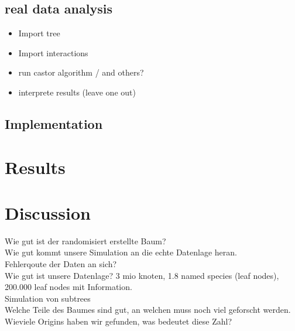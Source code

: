   \section{real data analysis}
    \begin{itemize}
      \item Import tree
      \item Import interactions
      \item run castor algorithm / and others?
      \item interprete results (leave one out)
    \end{itemize}

  \section{Implementation}

\chapter{Results}

\chapter{Discussion}
  Wie gut ist der randomisiert erstellte Baum? \\
  Wie gut kommt unsere Simulation an die echte Datenlage heran. \\
  Fehlerqoute der Daten an sich? \\
  Wie gut ist unsere Datenlage? 3 mio knoten, 1.8 named species (leaf nodes), 200.000 leaf nodes mit 
  Information. \\
  Simulation von subtrees \\
  Welche Teile des Baumes sind gut, an welchen muss noch viel geforscht werden. \\
  Wieviele Origins haben wir gefunden, was bedeutet diese Zahl? \\
  
